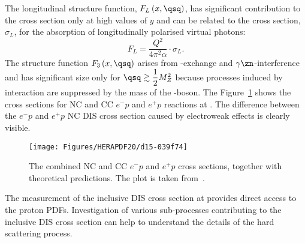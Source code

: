 The longitudinal structure function, $F_L\left(x,\qsq\right)$, has significant contribution to the cross section only at high values of $y$ and can be related to the cross section, $\sigma_L$, for the absorption of longitudinally polarised virtual photons:
\begin{equation}
F_L = \frac{Q^2}{4\pi^2\alpha}\cdot \sigma_L.
\label{eq:sigmal}
\end{equation}
The structure function $F_3\left(x,\qsq\right)$ arises from \zn-exchange and $\gamma\zn$-interference and has significant size only for $\qsq \gtrsim \dfrac{1}{2}M^2_Z$ because processes induced by \zn interaction are suppressed by the mass of the \zn-boson. The Figure~\ref{d15-039f74} shows the \dsdqsq cross sections for NC and CC $e^-p$ and $e^+p$ reactions at \hera. The difference between the $e^-p$ and $e^+p$ NC DIS cross section caused by electroweak effects is clearly visible.
\begin{figure}[t!]
	\centering
		\texttt{[image: Figures/HERAPDF20/d15-039f74]}
	\caption{The combined \hera NC and CC $e^-p$ and $e^+p$ cross sections, \dsdqsq together with theoretical predictions. The plot is taken from~\protect\cite{Abramowicz:2015mha}.}
	\label{d15-039f74}
\end{figure}

The measurement of the inclusive DIS cross section at \hera provides direct access to the proton PDFs. Investigation of various sub-processes contributing to the inclusive DIS cross section can help to understand the details of the hard scattering process.

